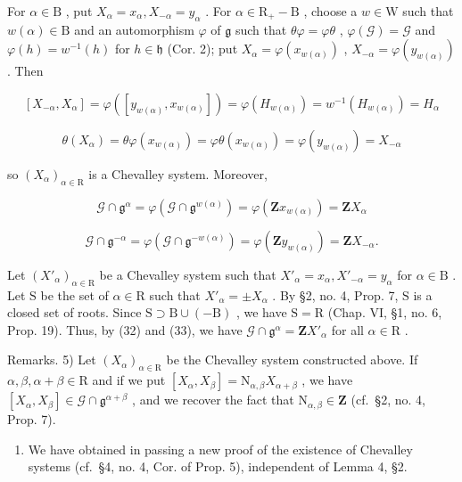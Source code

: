 For \(\alpha \in \mathrm{B}\) , put \(X_{\alpha} = x_{\alpha}, X_{-\alpha} = y_{\alpha}\) . For \(\alpha \in \mathrm{R}_{+} - \mathrm{B}\) , choose a \(w \in \mathrm{W}\) such that \(w(\alpha) \in \mathrm{B}\) and an automorphism \(\varphi\) of \(\mathfrak{g}\) such that \(\theta \varphi = \varphi \theta\) , \(\varphi(\mathcal{G}) = \mathcal{G}\) and \(\varphi(h) = w^{-1}(h)\) for \(h \in \mathfrak{h}\) (Cor. 2); put \(X_{\alpha} = \varphi(x_{w(\alpha)})\) , \(X_{-\alpha} = \varphi(y_{w(\alpha)})\) . Then

\[
[ X _ {- \alpha}, X _ {\alpha} ] = \varphi ([ y _ {w (\alpha)}, x _ {w (\alpha)} ]) = \varphi (H _ {w (\alpha)}) = w ^ {- 1} (H _ {w (\alpha)}) = H _ {\alpha}
\]

\[
\theta (X _ {\alpha}) = \theta \varphi (x _ {w (\alpha)}) = \varphi \theta (x _ {w (\alpha)}) = \varphi (y _ {w (\alpha)}) = X _ {- \alpha}
\]

so \((X_{\alpha})_{\alpha \in \mathrm{R}}\) is a Chevalley system. Moreover,

\[
\mathcal {G} \cap \mathfrak {g} ^ {\alpha} = \varphi (\mathcal {G} \cap \mathfrak {g} ^ {w (\alpha)}) = \varphi (\mathbf {Z} x _ {w (\alpha)}) = \mathbf {Z} X _ {\alpha}\tag{32}
\]

\[
\mathcal {G} \cap \mathfrak {g} ^ {- \alpha} = \varphi (\mathcal {G} \cap \mathfrak {g} ^ {- w (\alpha)}) = \varphi (\mathbf {Z} y _ {w (\alpha)}) = \mathbf {Z} X _ {- \alpha}.\tag{33}
\]

Let \((X'_{\alpha})_{\alpha \in \mathrm{R}}\) be a Chevalley system such that \(X'_{\alpha} = x_{\alpha}, X'_{-\alpha} = y_{\alpha}\) for \(\alpha \in \mathrm{B}\) . Let \(\mathrm{S}\) be the set of \(\alpha \in \mathrm{R}\) such that \(X'_{\alpha} = \pm X_{\alpha}\) . By §2, no. 4, Prop. 7, \(\mathrm{S}\) is a closed set of roots. Since \(\mathrm{S} \supset \mathrm{B} \cup (-\mathrm{B})\) , we have \(\mathrm{S} = \mathrm{R}\) (Chap. VI, §1, no. 6, Prop. 19). Thus, by (32) and (33), we have \(\mathcal{G} \cap \mathfrak{g}^{\alpha} = \mathbf{Z}X'_{\alpha}\) for all \(\alpha \in \mathrm{R}\) .

Remarks. 5) Let \((X_{\alpha})_{\alpha \in \mathrm{R}}\) be the Chevalley system constructed above. If \(\alpha, \beta, \alpha + \beta \in \mathrm{R}\) and if we put \([X_{\alpha}, X_{\beta}] = \mathrm{N}_{\alpha, \beta} X_{\alpha + \beta}\) , we have \([X_{\alpha}, X_{\beta}] \in \mathcal{G} \cap \mathfrak{g}^{\alpha + \beta}\) , and we recover the fact that \(\mathrm{N}_{\alpha, \beta} \in \mathbf{Z}\) (cf.~§2, no. 4, Prop. 7).

\begin{enumerate}
\def\labelenumi{\arabic{enumi})}
\setcounter{enumi}{5}
\tightlist
\item
  We have obtained in passing a new proof of the existence of Chevalley systems (cf.~§4, no. 4, Cor. of Prop. 5), independent of Lemma 4, §2.
\end{enumerate}

